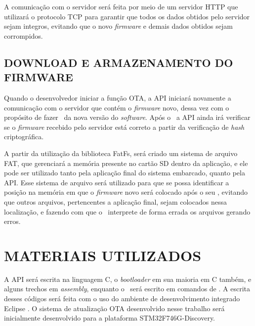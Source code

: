 A comunicação com o servidor será feita por meio de um servidor HTTP que utilizará o protocolo TCP para garantir que todos os dados obtidos pelo servidor sejam integros, evitando que o novo \textit{firmware} e demais dados obtidos sejam corrompidos. 


\subsection{DOWNLOAD E ARMAZENAMENTO DO FIRMWARE}

Quando o desenvolvedor iniciar a função OTA, a API iniciará novamente a comunicação com o servidor que contém o \textit{firmware} novo, dessa vez com o propósito de fazer \download\ da nova versão do \textit{software}. Após o \download\ a API ainda irá verificar se o \textit{firmware} recebido pelo servidor está correto a partir da verificação de \textit{hash} criptográfica. 

A partir da utilização da biblioteca FatFs, será criado um sistema de arquivo FAT, que gerenciará a memória presente no cartão SD dentro da aplicação, e ele pode ser utilizado tanto pela aplicação final do sistema embarcado, quanto pela API. Esse sistema de arquivo será utilizado para que se possa identificar a posição na memória em que o \textit{firmware} novo será colocado após o seu \download, evitando que outros arquivos, pertencentes a aplicação final, sejam colocados nessa localização, e fazendo com que o \bootloader\ interprete de forma errada os arquivos gerando erros.


\section{MATERIAIS UTILIZADOS}

A API será escrita na linguagem C, o \textit{bootloader} em sua maioria em C também, e alguns trechos em \textit{assembly}, enquanto o \linker\ será escrito em comandos de \linker. A escrita desses códigos será feita com o uso do ambiente de desenvolvimento integrado Eclipse \cite{Eclipse}. O sistema de atualização OTA desenvolvido nesse trabalho será inicialmente desenvolvido para a plataforma STM32F746G-Discovery.

